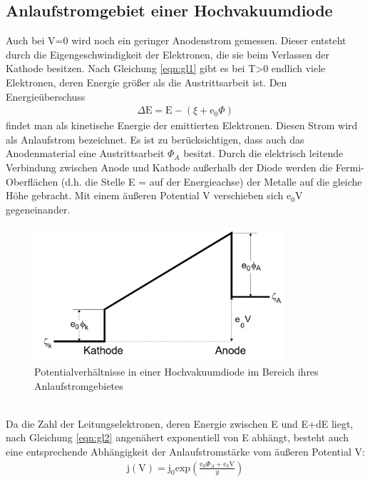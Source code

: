 \subsection{Anlaufstromgebiet einer Hochvakuumdiode}
Auch bei V=0 wird noch ein geringer Anodenstrom gemessen.
Dieser entsteht durch die Eigengeschwindigkeit der Elektronen, die sie beim Verlassen der Kathode besitzen.
Nach Gleichung \ref{eqn:gl1} gibt es bei T>0 endlich viele Elektronen, deren Energie größer als die Austrittsarbeit ist. 
Den Energieüberschuss 
\begin{align*}
    \Delta \text{E} = \text{E} - \left(\xi + \text{e}_0 \Phi \right)
\end{align*}
findet man als kinetische Energie der emittierten Elektronen.
Diesen Strom wird als Anlaufstrom bezeichnet.
Es ist zu berücksichtigen, dass auch das Anodenmaterial eine Austrittsarbeit $\Phi_A$ besitzt.
Durch die elektrisch leitende Verbindung zwischen Anode und Kathode außerhalb der Diode werden die Fermi-Oberflächen (d.h. die Stelle E = \xi auf der Energieachse) der Metalle auf die gleiche Höhe gebracht.
Mit einem äußeren Potential V verschieben sich $\text{e}_0 \text{V}$ gegeneinander.
\begin{figure}
    \centering
    \includegraphics[height=5.0cm]{data/abb5.jpg}
    \caption{Potentialverhältnisse in einer Hochvakuumdiode im Bereich ihres Anlaufstromgebietes  \cite{V504}}
    \label{fig:abb5}
\end{figure} \\
\noindent
Da die Zahl der Leitungselektronen, deren Energie zwischen E und E+dE liegt, nach Gleichung \ref{eqn:gl2} angenähert exponentiell von E abhängt, besteht auch eine entsprechende Abhängigkeit der Anlaufstromstärke vom äußeren Potential V: 
\begin{align*}
    \text{j}(\text{V}) = \text{j}_0 \text{exp} \left(\frac{\text{e}_0 \Phi_A + \text{e}_0 \text{V}}{y}\right)
\end{align*}

